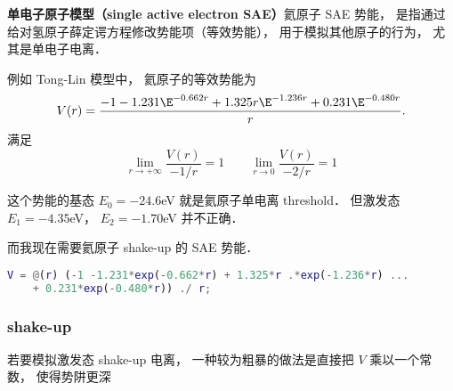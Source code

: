 
\textbf{单电子原子模型（single active electron SAE）}氦原子 SAE 势能， 是指通过给对氢原子薛定谔方程修改势能项（等效势能）， 用于模拟其他原子的行为， 尤其是单电子电离．

例如 Tong-Lin 模型中， 氦原子的等效势能为
\begin{equation}
V(r) = \frac{-1 -1.231\E^{-0.662r} + 1.325r \E^{-1.236r} + 0.231\E^{-0.480r}}{r}.
\end{equation}
满足
\begin{equation}
\lim_{r\to +\infty} \frac{V(r)}{-1/r} = 1
\qquad
\lim_{r\to 0} \frac{V(r)}{-2/r} = 1
\end{equation}

这个势能的基态 $E_0 = -24.6$eV 就是氦原子单电离 threshold． 但激发态 $E_1 = -4.35$eV， $E_2 = -1.70$eV 并不正确．

而我现在需要氦原子 shake-up 的 SAE 势能．

\begin{lstlisting}[language=matlab]
V = @(r) (-1 -1.231*exp(-0.662*r) + 1.325*r .*exp(-1.236*r) ...
    + 0.231*exp(-0.480*r)) ./ r;
\end{lstlisting}

\subsubsection{shake-up}
若要模拟激发态 shake-up 电离， 一种较为粗暴的做法是直接把 $V$ 乘以一个常数， 使得势阱更深
